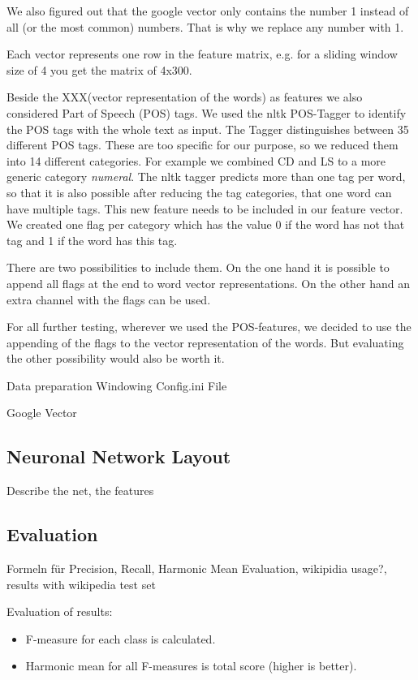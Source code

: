 We also figured out that the google vector only contains the number 1 instead of all (or the most common) numbers. 
That is why we replace any number with 1.

Each vector represents one row in the feature matrix, e.g. for a sliding window size of 4 you get the matrix of 4x300. 

Beside the XXX(vector representation of the words) as features we also considered Part of Speech (POS) tags. 
We used the nltk POS-Tagger to identify the POS tags with the whole text as input.
The Tagger distinguishes between 35 different POS tags. 
These are too specific for our purpose, so we reduced them into 14 different categories.
For example we combined CD and LS to a more generic category \emph{numeral}. 
The nltk tagger predicts more than one tag per word, so that it is also possible after reducing the tag categories, that one word can have multiple tags.
This new feature needs to be included in our feature vector.
We created one flag per category which has the value 0 if the word has not that tag and 1 if the word has this tag.

There are two possibilities to include them. On the one hand it is possible to append all flags at the end to word vector representations.
On the other hand an extra channel with the flags can be used.

For all further testing, wherever we used the POS-features, we decided to use the appending of the flags to the vector representation of the words.
But evaluating the other possibility would also be worth it. 


Data preparation
Windowing
Config.ini File


Google Vector

\subsection{Neuronal Network Layout}
Describe the net, the features

\subsection{Evaluation}
Formeln für Precision, Recall, Harmonic Mean
Evaluation, wikipidia usage?, results with wikipedia test set 

Evaluation of results:
\begin{itemize}
\item F-measure for each class is calculated.
\item Harmonic mean for all F-measures is total score (higher is better).
\end{itemize}

